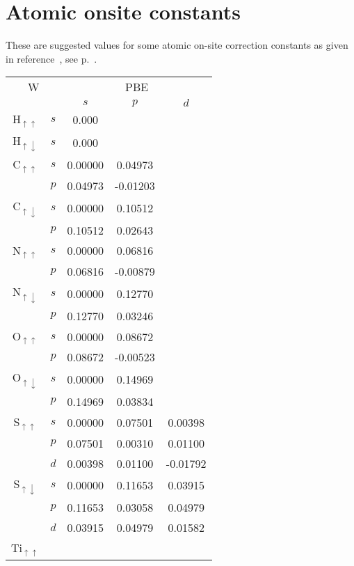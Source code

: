 \chapter{Atomic onsite constants}
\label{app:onsiteconst}

These are suggested values for some atomic on-site correction constants
as given in reference~\cite{garcia14Thesis}, see p.~.

\begin{center}
  \begin{small}
\begin{tabular}{|cc|ccc|} \hline
\multicolumn{2}{|c|}{W}
   & \multicolumn{3}{c|}{PBE}       \\ \cline{3-5}
   &     &    $s$ & $p$    & $d$    \\ \hline
H$_{\uparrow\uparrow}$
   & $s$ &  0.000 &&\\\cline{3-5}
H$_{\uparrow\downarrow}$
   & $s$ &  0.000 &&\\\hline
C$_{\uparrow\uparrow}$
   & $s$ &  0.00000&  0.04973&\\
   & $p$ &  0.04973& -0.01203&\\\cline{3-5}
C$_{\uparrow\downarrow}$
   & $s$ &  0.00000&  0.10512&\\
   & $p$ &  0.10512&  0.02643&\\\hline
N$_{\uparrow\uparrow}$
   & $s$ &  0.00000&  0.06816&\\
   & $p$ &  0.06816& -0.00879&\\\cline{3-5}
N$_{\uparrow\downarrow}$
   & $s$ &  0.00000&  0.12770&\\
   & $p$ &  0.12770&  0.03246&\\\hline
O$_{\uparrow\uparrow}$
&$s$ &0.00000&  0.08672 &\\
&$p$ &0.08672& -0.00523 &\\\cline{3-5}
O$_{\uparrow\downarrow}$
&$s$ &0.00000&  0.14969 &\\
&$p$ &0.14969&  0.03834 &\\\hline
S$_{\uparrow\uparrow}$
&$s$ &0.00000 &0.07501& 0.00398\\
&$p$ &0.07501 &0.00310& 0.01100\\
&$d$ &0.00398 &0.01100&-0.01792\\\cline{3-5}
S$_{\uparrow\downarrow}$
&$s$ &0.00000 &0.11653& 0.03915\\
&$p$ &0.11653 &0.03058& 0.04979\\
&$d$ &0.03915 &0.04979& 0.01582\\\hline
Ti$_{\uparrow\uparrow}$

\end{tabular}
\end{small}
\end{center}
